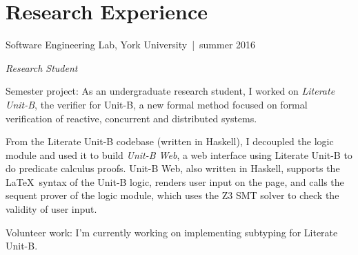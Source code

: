 \documentclass[12pt,letterpaper]{article}
\renewenvironment{itemize}{
  \begin{list}{}{
    \setlength{\leftmargin}{1.5em}
    \setlength{\itemsep}{0.25em}
    \setlength{\parskip}{0pt}
    \setlength{\parsep}{0.25em}
  }
}{
  \end{list}
}
\begin{document}
\section*{Research Experience}

\begin{itemize}
\item {\large Software Engineering Lab, } York University\, |\, {\small summer 2016}

  \textit{Research Student}

  \begin{itemize}
  \item Semester project: As an undergraduate research student, I
    worked on \textit{Literate Unit-B}, the verifier for Unit-B, a new
    formal method focused on formal verification of reactive, concurrent
    and distributed systems.

    From the Literate Unit-B codebase (written in Haskell), I decoupled the
    logic module and used it to build \textit{Unit-B Web}, a web interface using
    Literate Unit-B to do predicate calculus proofs. \linebreak Unit-B Web, also
    written in Haskell, supports the \LaTeX\ syntax of the Unit-B logic, renders
    user input on the page, and calls the sequent prover of the logic
    module, which uses the Z3 SMT solver to check the validity of user
    input.

  \item Volunteer work: I'm currently working on implementing subtyping for
    Literate Unit-B.
  \end{itemize}
  \end{itemize}
\end{document}
